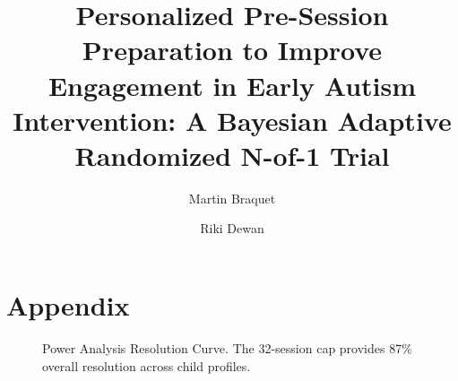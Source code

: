 \documentclass[9pt,a4paper,twocolumn,twoside]{rho-class/rho}
\title{Personalized Pre-Session Preparation to Improve Engagement in Early Autism Intervention: A Bayesian Adaptive Randomized N-of-1 Trial}
\author[a]{Martin Braquet}
\author[b]{Riki Dewan}
\affil[a]{Independant}
\affil[b]{Maya Care and Grow, Agartala}
\begin{document}
	

	\maketitle
	\thispagestyle{firststyle}

	\section{Appendix}
	

	
	\begin{figure}[b]
		\centering
		\resizebox{\textwidth}{!}{
			
		}
		\caption{Power Analysis Resolution Curve. The 32-session cap provides 87\% overall resolution across child profiles.}
		\label{fig:01_power_analysis}
		\vspace{190pt}
	\end{figure}
	

	\printbibliography
	
\end{document}
